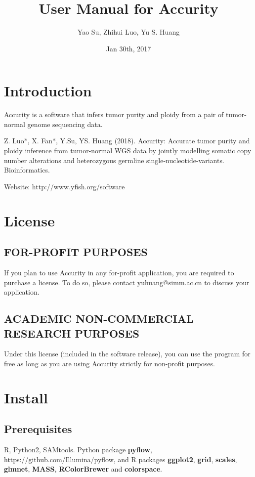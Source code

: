 \documentclass{article}
\begin{document}
\title{User Manual for Accurity}
\date{Jan 30th, 2017}
\author{Yao Su, Zhihui Luo, Yu S. Huang}
\maketitle


\section{Introduction}
Accurity is a software that infers tumor purity and ploidy from a pair of tumor-normal genome sequencing data.


Z. Luo*, X. Fan*, Y.Su, YS. Huang (2018). Accurity: Accurate tumor purity and ploidy inference from tumor-normal WGS data by jointly modelling somatic copy number alterations and heterozygous germline single-nucleotide-variants. Bioinformatics.

Website: http://www.yfish.org/software

\section{License}
\subsection{FOR-PROFIT PURPOSES}
If you plan to use Accurity in any for-profit application, you are required to purchase a license. To do so, please contact yuhuang@simm.ac.cn to discuss your application.

\subsection{ACADEMIC NON-COMMERCIAL RESEARCH PURPOSES}
Under this license (included in the software release), you can use the program for free as long as you are using Accurity strictly for non-profit purposes.

\section{Install}
\subsection{Prerequisites}

R, Python2, SAMtools. Python package \textbf{pyflow}, https://github.com/Illumina/pyflow, and R packages \textbf{ggplot2}, \textbf{grid}, \textbf{scales}, \textbf{glmnet}, \textbf{MASS}, \textbf{RColorBrewer} and \textbf{colorspace}.
\end{document}
